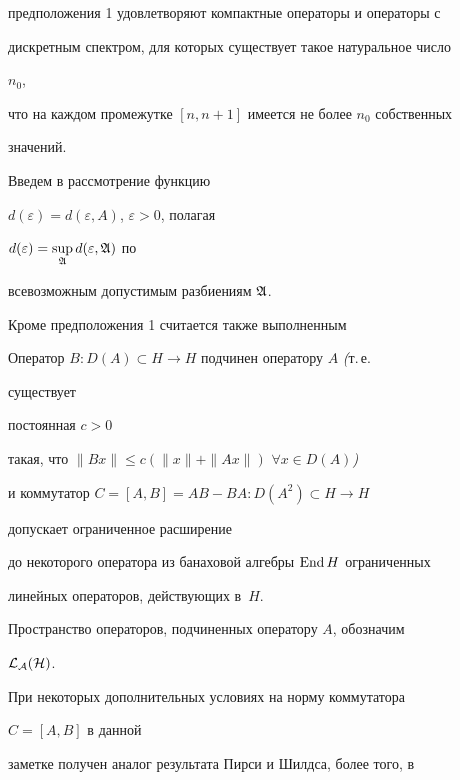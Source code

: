 предположения 1 удовлетворяют компактные операторы и операторы с


дискретным спектром, для которых существует такое натуральное число


$n_0$,


что на каждом промежутке $[n,n+1]$ имеется не более $n_0$ собственных


значений.





Введем в рассмотрение функцию


$d(\varepsilon)=d(\varepsilon,A)$, $\varepsilon>0$, полагая


$d(\varepsilon)=\sup\limits_{\frak A}d(\varepsilon,\frak A)$ по


всевозможным допустимым разбиениям $\frak A$.





Кроме предположения 1 считается также выполненным





\begin{assmp}


Оператор $B:D(A)\subset H\to H$ подчинен оператору $A$ {\em (}т.\,е.


существует


постоянная $c>0$


такая, что $\|Bx\|\le c(\|x\|+\|Ax\|)$ $\forall x\in D(A)${\em )}


и коммутатор $C=[A,B]=AB-BA:D(A^2)\subset H\to H$


допускает ограниченное расширение


до некоторого оператора из банаховой алгебры $\operatorname{End} H$ ограниченных


линейных операторов, действующих в~$H$.


\end{assmp}





Пространство операторов, подчиненных оператору $A$, обозначим


$\cal L_A(H)$.





При некоторых дополнительных условиях на норму коммутатора


$C=[A,B]$ в данной


заметке получен аналог результата Пирси и Шилдса, более того, в


